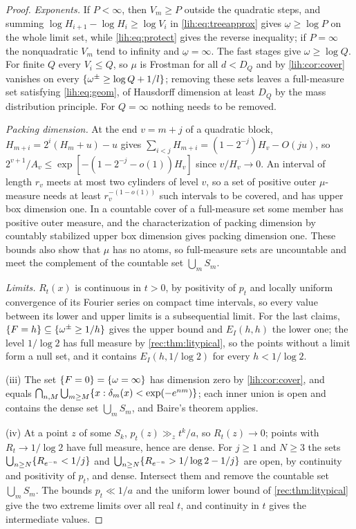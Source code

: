 \begin{proof}
\emph{Exponents.} If $P<\infty$, then $V_m\ge P$ outside the quadratic steps, and summing
$\log H_{i+1}-\log H_i\ge\log V_i$ in \eqref{lih:eq:treeapprox} gives $\underline\omega\ge\log P$ on the whole limit set, while
\eqref{lih:eq:protect} gives the reverse inequality; if $P=\infty$ the nonquadratic $V_m$ tend to infinity and
$\underline\omega=\infty$. The fast stages give $\omega\ge\log Q$. For finite $Q$ every $V_i\le Q$, so $\mu$ is Frostman for all
$d<D_Q$ and by \cref{lih:cor:cover} vanishes on every $\{\omega^\pm\ge\log Q+1/l\}$; removing these sets leaves a
full-measure set satisfying \eqref{lih:eq:geom}, of Hausdorff dimension at least $D_Q$ by the mass
distribution principle. For $Q=\infty$ nothing needs to be removed.

\emph{Packing dimension.} At the end $v=m+j$ of a quadratic block, $H_{m+i}=2^i(H_m+u)-u$ gives
$\sum_{i<j}H_{m+i}=(1-2^{-j})H_v-O(ju)$, so $2^{v+1}/A_v\le\exp[-(1-2^{-j}-o(1))H_v]$ since $v/H_v\to0$. An interval of
length $r_v$ meets at most two cylinders of level $v$, so a set of positive outer $\mu$-measure needs at least
$r_v^{-(1-o(1))}$ such intervals to be covered, and has upper box dimension one. In a countable cover of a
full-measure set some member has positive outer measure, and the characterization of packing
dimension by countably stabilized upper box dimension \cite[Chapter~3]{Falconer2014Fractal} gives packing
dimension one. These bounds also show that $\mu$ has no atoms, so full-measure sets are uncountable and
meet the complement of the countable set $\bigcup_mS_m$.

\emph{Limits.} $R_t(x)$ is continuous in $t>0$, by positivity of $p_t$ and locally uniform convergence of its
Fourier series on compact time intervals, so every value between its lower and upper limits is a
subsequential limit. For the last claims, $\{F=h\}\subseteq\{\omega^\pm\ge1/h\}$ gives the upper bound and
$E_I(h,h)$ the lower one; the level $1/\log2$ has full measure by \cref{rec:thm:litypical}, so the points without
a limit form a null set, and it contains $E_I(h,1/\log2)$ for every $h<1/\log2$.

(iii) The set $\{F=0\}=\{\omega=\infty\}$ has dimension zero by \cref{lih:cor:cover}, and equals
$\bigcap_{n,M}\bigcup_{m\ge M}\{x:\delta_m(x)<\exp(-e^{nm})\}$; each inner union is open and contains the dense set
$\bigcup_mS_m$, and Baire's theorem applies.

(iv) At a point $z$ of some $S_k$, $p_t(z)\gg_zt^k/a$, so $R_t(z)\to0$; points with $R_t\to1/\log2$ have full
measure, hence are dense. For $j\ge1$ and $N\ge3$ the sets $\bigcup_{n\ge N}\{R_{e^{-n}}<1/j\}$ and
$\bigcup_{n\ge N}\{R_{e^{-n}}>1/\log2-1/j\}$ are open, by continuity and positivity of $p_t$, and dense. Intersect them
and remove the countable set $\bigcup_mS_m$. The bounds $p_t\ll1/a$ and the uniform lower bound of
\cref{rec:thm:litypical} give the two extreme limits over all real $t$, and continuity in $t$ gives the intermediate values.
\end{proof}

